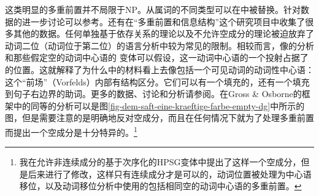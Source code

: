 \largerpage
这类明显的多重前置并不局限于NP。从属词的不同类型可以在\vfc 中被替换。针对数据的进一步讨论可以参考。还有在“多重前置和信息结构”这个研究项目中收集了很多其他的数据\citep{Bildhauer2011a}。任何单独基于依存关系的理论以及不允许空成分的理论被迫放弃了动词二位（动词位于第二位）的语言分析中较为常见的限制。相较而言，像\gbc 的分析和那些假定空的动词中心语的\hpsgc
变体可以假设，这一动词中心语的一个投射占据了\vfc 的位置。这就解释了为什么\vfc 中的材料看上去像包括一个可见动词的动词性中心语：这个“前场”（Vorfelds）内部有结构区分。它们可以有一个填充的\nf，还有一个填充到句子右边界的助词。更多的数据、讨论和分析请参阅。在Gross \& Osborne的框架\citeyearpar{GO2009a}中的同等的分析可以是图\vref{fig-dem-saft-eine-kraeftige-farbe-empty-dg}中所示的图，但是需要注意的是\citet[]{GO2009a}明确地反对空成分，而且在任何情况下就为了处理多重前置而提出一个空成分是十分特异的。\footnote{
我在允许非连续成分的基于次序化的HPSG变体中提出了这样一个空成分\citep{Mueller2002c}，但是后来进行了修改，这样只有连续成分才是可以的，动词位置被处理为中心语移位，以及动词移位分析中使用的包括相同空的动词中心语的多重前置\citep{Mueller2005d,MuellerGS}。
}
